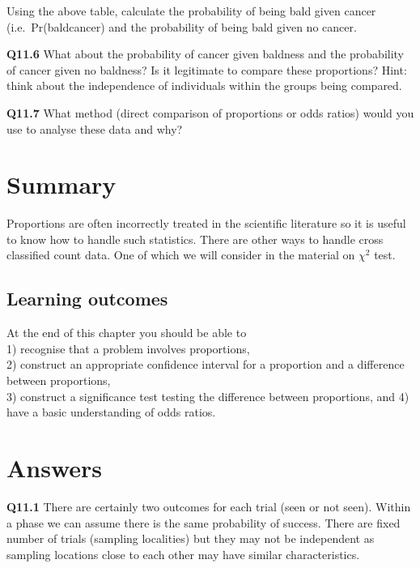 \documentclass[
  oneside]{krantz}
\begin{document}
Using the above table, calculate the probability of being bald given cancer (i.e.~Pr(bald\textbar cancer) and the probability of being bald given no cancer.

\textbf{Q11.6} What about the probability of cancer given baldness and the probability of cancer given no baldness? Is it legitimate to compare these proportions? Hint: think about the independence of individuals within the groups being compared.

\textbf{Q11.7} What method (direct comparison of proportions or odds ratios) would you use to analyse these data and why?

\hypertarget{SUMprop}{%
\section{Summary}\label{SUMprop}}

Proportions are often incorrectly treated in the scientific literature so it is useful to know how to handle such statistics. There are other ways to handle cross classified count data. One of which we will consider in the material on \(\chi^{2}\) test.

\hypertarget{learning-outcomes-7}{%
\subsection{Learning outcomes}\label{learning-outcomes-7}}

At the end of this chapter you should be able to\\
1) recognise that a problem involves proportions,\\
2) construct an appropriate confidence interval for a proportion and a difference between proportions,\\
3) construct a significance test testing the difference between proportions, and
4) have a basic understanding of odds ratios.

\hypertarget{ANSprop}{%
\section{Answers}\label{ANSprop}}

\textbf{Q11.1} There are certainly two outcomes for each trial (seen or not seen). Within a phase we can assume there is the same probability of success. There are fixed number of trials (sampling localities) but they may not be independent as sampling locations close to each other may have similar characteristics.
\end{document}
